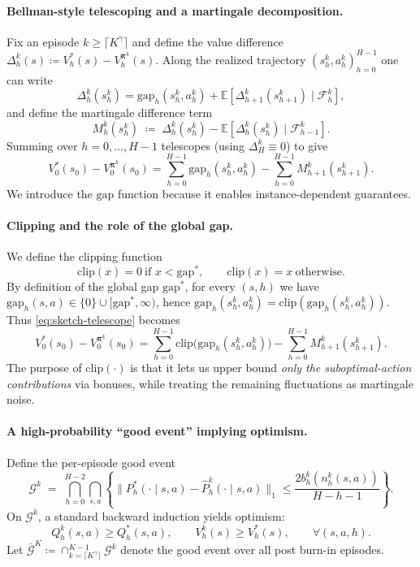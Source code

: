 \documentclass[11pt]{article}
\newcommand{\pii}{\boldsymbol{\pi}}
\newcommand{\E} {\mathbb{E}}
\newcommand{\Dvs}{\Delta}
\newcommand{\Dvsm}{M}
\newcommand{\clip}{\mathrm{clip}}
\newcommand{\gap}{\mathrm{gap}}
\newcommand{\gapstar}{\mathrm{gap}^*}
\begin{document}
\paragraph{Bellman-style telescoping and a martingale decomposition.}
Fix an episode $k\ge \lceil K^\gamma\rceil$ and define the value difference
$\Dvs_h^k(s)\coloneqq V_h^*(s)-V_h^{\pii^k}(s)$.
Along the realized trajectory $(s_h^k,a_h^k)_{h=0}^{H-1}$ one can write
\[
\Dvs_h^k(s_h^k)
=
\gap_h(s_h^k,a_h^k)
+
\E\!\left[\Dvs_{h+1}^k(s_{h+1}^k)\mid \mathcal{F}_h^k\right],
\]
and define the martingale difference term
\[
\Dvsm_{h}^k(s_{h}^k)
\;\coloneqq\;
\Dvs_{h}^k(s_{h}^k)
-\E\!\left[\Dvs_{h}^k(s_{h}^k)\mid \mathcal{F}_{h-1}^k\right].
\]
Summing over $h=0,\dots,H-1$ telescopes (using $\Dvs_H^k\equiv 0$) to give
\begin{equation}\label{eq:sketch-telescope}
V_0^*(s_0)-V_0^{\pii^k}(s_0)
=
\sum_{h=0}^{H-1}\gap_h(s_h^k,a_h^k)
-
\sum_{h=0}^{H-1}\Dvsm_{h+1}^k(s_{h+1}^k).
\end{equation}
We introduce the $\gap$ function because it enables instance-dependent guarantees.

\paragraph{Clipping and the role of the global gap.}
We define the clipping function
\[
\clip(x)=0 \ \text{if } x<\gapstar,\qquad \clip(x)=x \ \text{otherwise}.
\]
By definition of the global gap $\gapstar$, for every $(s,h)$ we have
$\gap_h(s,a)\in\{0\}\cup[\gapstar,\infty)$, hence $\gap_h(s_h^k,a_h^k)=\clip(\gap_h(s_h^k,a_h^k))$.
Thus \eqref{eq:sketch-telescope} becomes
\[
V_0^*(s_0)-V_0^{\pii^k}(s_0)
=
\sum_{h=0}^{H-1}\clip\!\big(\gap_h(s_h^k,a_h^k)\big)
-
\sum_{h=0}^{H-1}\Dvsm_{h+1}^k(s_{h+1}^k).
\]
The purpose of $\clip(\cdot)$ is that it lets us upper bound \emph{only the suboptimal-action contributions}
via bonuses, while treating the remaining fluctuations as martingale noise.

\paragraph{A high-probability ``good event'' implying optimism.}
Define the per-episode good event
\[
\mathcal{G}^k
\;=\;
\bigcap_{h=0}^{H-2}\bigcap_{s,a}
\left\{
\|P_h^*(\cdot\mid s,a)-\hat P_h^k(\cdot\mid s,a)\|_1
\le
\frac{2b_h^k(n_h^k(s,a))}{H-h-1}
\right\}.
\]
On $\mathcal{G}^k$, a standard backward induction yields optimism:
\begin{equation}\label{eq:sketch-optimism}
Q_h^k(s,a)\ge Q_h^*(s,a),\qquad V_h^k(s)\ge V_h^*(s),\qquad \forall (s,a,h).
\end{equation}
Let $\bar{\mathcal{G}}^K\coloneqq \cap_{k=\lceil K^\gamma\rceil}^{K-1}\mathcal{G}^k$ denote the good event over
all post burn-in episodes.
\end{document}
